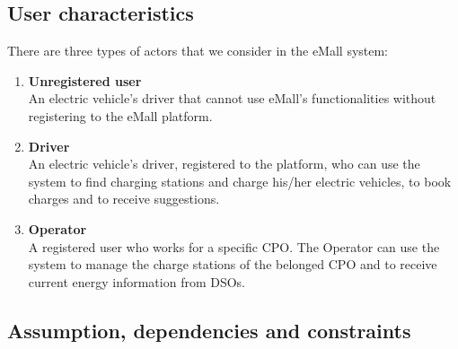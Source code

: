 \documentclass[../main.tex]{subfiles}
\begin{document}
\subsection{User characteristics}
There are three types of actors that we consider in the eMall system:
\begin{enumerate}
    \item \textbf{Unregistered user} \\
        An electric vehicle’s driver that cannot use eMall’s functionalities without registering to the eMall platform.
    \item \textbf{Driver} \\
        An electric vehicle’s driver, registered to the platform, who can use the system to find charging stations and charge his/her electric vehicles, to book charges and to receive suggestions.
    \item \textbf{Operator} \\
        A registered user who works for a specific CPO. The Operator can use the system to manage the charge stations of the belonged CPO and to receive current energy information from DSOs.
\end{enumerate}




\subsection{Assumption, dependencies and constraints}
\end{document}
